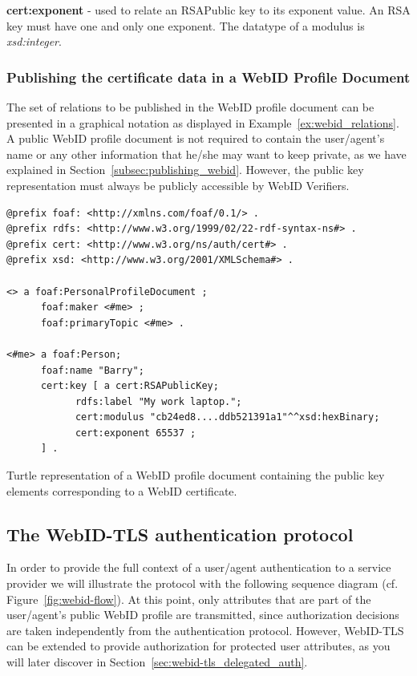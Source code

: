 \textbf{cert:exponent} - used to relate an RSAPublic key to its exponent value. An RSA key must have one and only one exponent. The datatype of a modulus is \textit{xsd:integer}.\\


\subsubsection{Publishing the certificate data in a WebID Profile Document}
\label{subsubsec:publishing_webid}
The set of relations to be published in the WebID profile document can be presented in a graphical notation as displayed in Example~\ref{ex:webid_relations}. A public WebID profile document is not required to contain the user/agent's name or any other information that he/she may want to keep private, as we have explained in Section~\ref{subsec:publishing_webid}. However, the public key representation must always be publicly accessible by WebID Verifiers.

\begin{example}
\begin{verbatim}
@prefix foaf: <http://xmlns.com/foaf/0.1/> .
@prefix rdfs: <http://www.w3.org/1999/02/22-rdf-syntax-ns#> .
@prefix cert: <http://www.w3.org/ns/auth/cert#> .
@prefix xsd: <http://www.w3.org/2001/XMLSchema#> .

<> a foaf:PersonalProfileDocument ;
      foaf:maker <#me> ;
      foaf:primaryTopic <#me> .

<#me> a foaf:Person;
      foaf:name "Barry";
      cert:key [ a cert:RSAPublicKey;
            rdfs:label "My work laptop.";
            cert:modulus "cb24ed8....ddb521391a1"^^xsd:hexBinary;
            cert:exponent 65537 ;
      ] .
\end{verbatim}
\caption{Turtle representation of a WebID profile document containing the public key elements corresponding to a WebID certificate.}
\label{ex:webid_relations}
\end{example}

\subsection{The WebID-TLS authentication protocol}
\label{subsec:webid-tls_auth}
In order to provide the full context of a user/agent authentication to a service provider we will illustrate the protocol with the following sequence diagram (cf. Figure~\ref{fig:webid-flow}). At this point, only attributes that are part of the user/agent's public WebID profile are transmitted, since authorization decisions are taken independently from the authentication protocol. However, WebID-TLS can be extended to provide authorization for protected user attributes, as you will later discover in Section~\ref{sec:webid-tls_delegated_auth}.\\

